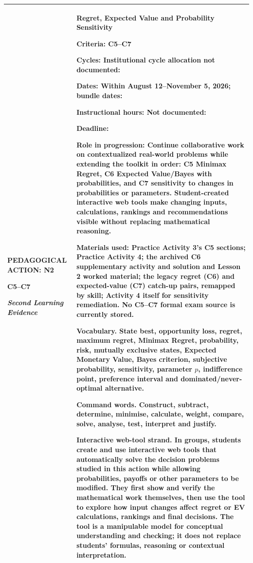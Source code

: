 \documentclass[10pt,letterpaper]{article}
\newcommand{\labelled}[2]{\textbf{#1:} #2\par}
\begin{document}
	\noindent
	\begin{tabularx}{\textwidth}{|>{\RaggedRight\arraybackslash}p{2.42in}|>{\RaggedRight\arraybackslash}X|}
		\hline
		\textbf{PEDAGOGICAL ACTION: N2}\par
		\textbf{C5--C7}\par
		\textit{Second Learning Evidence}
		&
		\textbf{Regret, Expected Value and Probability Sensitivity}\par
		\vspace{2pt}
		\fontsize{8.15}{10.25}\selectfont
		\labelled{Criteria}{C5--C7}
		\labelled{Cycles}{Institutional cycle allocation not documented: \underline{\hspace{2.2in}}}
		\labelled{Dates}{Within August 12--November 5, 2026; bundle dates: \underline{\hspace{2.1in}}}
		\labelled{Instructional hours}{Not documented: \underline{\hspace{1.6in}}}
		\labelled{Deadline}{\underline{\hspace{3in}}}
		\labelled{Role in progression}{Continue collaborative work on contextualized real-world problems while extending the toolkit in order: C5 Minimax Regret, C6 Expected Value/Bayes with probabilities, and C7 sensitivity to changes in probabilities or parameters. Student-created interactive web tools make changing inputs, calculations, rankings and recommendations visible without replacing mathematical reasoning.}
		\labelled{Materials used}{Practice Activity 3's C5 sections; Practice Activity 4; the archived C6 supplementary activity and solution and Lesson 2 worked material; the legacy regret (C6) and expected-value (C7) catch-up pairs, remapped by skill; Activity 4 itself for sensitivity remediation. No C5--C7 formal exam source is currently stored.}
		
		\textbf{Vocabulary.} State best, opportunity loss, regret, maximum regret,
		Minimax Regret, probability, risk, mutually exclusive states, Expected Monetary
		Value, Bayes criterion, subjective probability, sensitivity, parameter $p$,
		indifference point, preference interval and dominated/never-optimal alternative.
		
		\textbf{Command words.} Construct, subtract, determine, minimise, calculate,
		weight, compare, solve, analyse, test, interpret and justify.

		\textbf{Interactive web-tool strand.} In groups, students create and use
		interactive web tools that automatically solve the decision problems studied
		in this action while allowing probabilities, payoffs or other parameters to be
		modified. They first show and verify the mathematical work themselves, then
		use the tool to explore how input changes affect regret or EV calculations,
		rankings and final decisions. The tool is a manipulable model for conceptual
		understanding and checking; it does not replace students' formulas, reasoning
		or contextual interpretation.
		\\
		\hline
	\end{tabularx}
	
\end{document}
